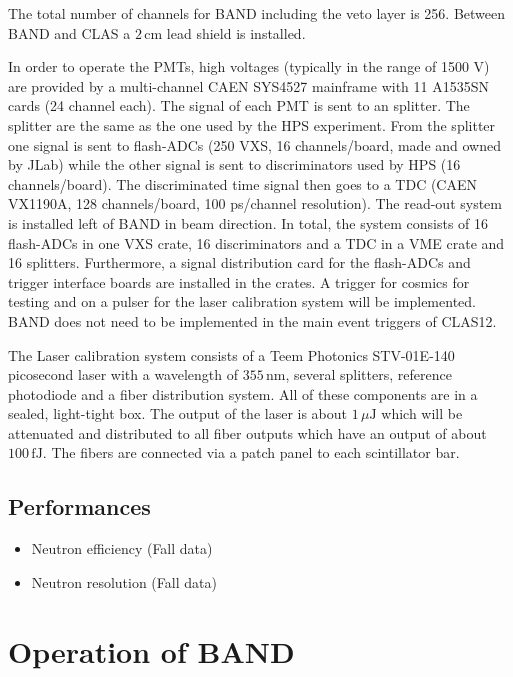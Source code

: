 \documentclass[review]{elsarticle}
\begin{document}
The total number of channels for BAND including the veto layer is 256. Between BAND and CLAS a $2\,\mathrm{cm}$ lead shield is installed.


In order to operate the PMTs, high voltages (typically in the range of 1500 V) are provided by a multi-channel CAEN SYS4527 mainframe with 11 A1535SN cards (24 channel each).
The signal of each PMT is sent to an splitter. The splitter are the same as the one used by the HPS experiment.
From the splitter one signal is sent to flash-ADCs (250 VXS, 16 channels/board, made and owned by JLab) while the other signal is sent to  discriminators used by HPS (16 channels/board).
The discriminated time signal then goes to a TDC (CAEN VX1190A, 128 channels/board, 100 ps/channel resolution). The read-out system is installed left of BAND in beam direction. 
In total, the system consists of 16 flash-ADCs in one VXS crate, 16 discriminators and a TDC in a VME crate and 16 splitters.  Furthermore, a signal distribution card for the flash-ADCs and trigger interface boards are installed in the crates. A trigger for cosmics for testing and on a pulser for the laser calibration system will be implemented. BAND does not need to be implemented in the main event triggers of CLAS12.

The Laser calibration system consists of a Teem Photonics STV-01E-140 picosecond laser with a wavelength of $355\,\mathrm{nm}$, several splitters, reference photodiode and a fiber distribution system. All of these components are in a sealed, light-tight box. The output of the laser is about $1\,\mu\mathrm{J}$ which will be attenuated and distributed to all fiber outputs which have an output of about $100\,\mathrm{fJ}$. The fibers are connected via a patch panel to each scintillator bar. 

\subsection{Performances}

\begin{itemize}
\item Neutron efficiency (Fall data)
\item Neutron resolution (Fall data)
\end{itemize}

\section{Operation of BAND}
\end{document}

